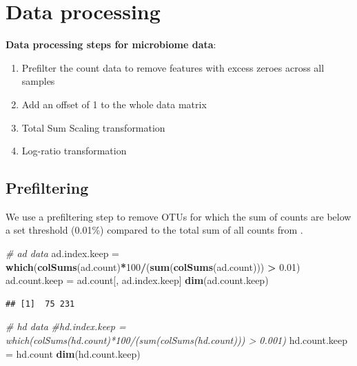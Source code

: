 \documentclass[]{book}
\newenvironment{Shaded}{\begin{snugshade}}{\end{snugshade}}
\newcommand{\KeywordTok}[1]{\textcolor[rgb]{0.13,0.29,0.53}{\textbf{#1}}}
\newcommand{\DecValTok}[1]{\textcolor[rgb]{0.00,0.00,0.81}{#1}}
\newcommand{\FloatTok}[1]{\textcolor[rgb]{0.00,0.00,0.81}{#1}}
\newcommand{\StringTok}[1]{\textcolor[rgb]{0.31,0.60,0.02}{#1}}
\newcommand{\CommentTok}[1]{\textcolor[rgb]{0.56,0.35,0.01}{\textit{#1}}}
\newcommand{\OperatorTok}[1]{\textcolor[rgb]{0.81,0.36,0.00}{\textbf{#1}}}
\newcommand{\NormalTok}[1]{#1}
\providecommand{\tightlist}{%
  \setlength{\itemsep}{0pt}\setlength{\parskip}{0pt}}
\begin{document}
\section{Data processing}\label{data-processing}

\textbf{Data processing steps for microbiome data}:

\begin{enumerate}
\def\labelenumi{\arabic{enumi}.}
\tightlist
\item
  Prefilter the count data to remove features with excess zeroes across
  all samples\\
\item
  Add an offset of 1 to the whole data matrix\\
\item
  Total Sum Scaling transformation\\
\item
  Log-ratio transformation
\end{enumerate}

\subsection{Prefiltering}\label{prefiltering}

We use a prefiltering step to remove OTUs for which the sum of counts
are below a set threshold (0.01\%) compared to the total sum of all
counts from \citep{arumugam2011enterotypes}.

\begin{Shaded}
\begin{Highlighting}[]
\CommentTok{# ad data}
\NormalTok{ad.index.keep =}\StringTok{ }\KeywordTok{which}\NormalTok{(}\KeywordTok{colSums}\NormalTok{(ad.count)}\OperatorTok{*}\DecValTok{100}\OperatorTok{/}\NormalTok{(}\KeywordTok{sum}\NormalTok{(}\KeywordTok{colSums}\NormalTok{(ad.count))) }\OperatorTok{>}\StringTok{ }\FloatTok{0.01}\NormalTok{)}
\NormalTok{ad.count.keep =}\StringTok{ }\NormalTok{ad.count[, ad.index.keep]}
\KeywordTok{dim}\NormalTok{(ad.count.keep)}
\end{Highlighting}
\end{Shaded}

\begin{verbatim}
## [1]  75 231
\end{verbatim}

\begin{Shaded}
\begin{Highlighting}[]
\CommentTok{# hd data}
\CommentTok{#hd.index.keep = which(colSums(hd.count)*100/(sum(colSums(hd.count))) > 0.001)}
\NormalTok{hd.count.keep =}\StringTok{ }\NormalTok{hd.count}
\KeywordTok{dim}\NormalTok{(hd.count.keep)}
\end{Highlighting}
\end{Shaded}
\end{document}
